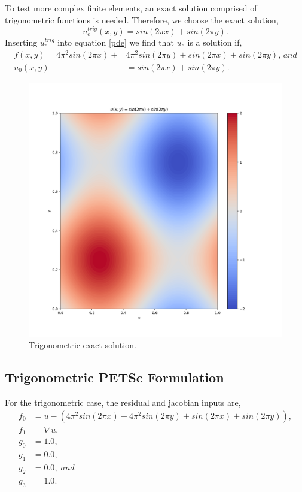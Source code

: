 To test more complex finite elements, an exact solution comprised of trigonometric functions is needed.  Therefore, we choose the exact solution,
\begin{equation}
u_e^{trig}(x,y) = sin( 2 \pi x) + sin( 2 \pi y).
\end{equation}
Inserting $u_e^{trig}$ into equation \eqref{pde} we find that $u_e$ is a solution if,
\begin{align}
f(x,y) = 4 \pi^2 sin(2 \pi x) +& 4 \pi^2 sin(2 \pi y) + sin( 2 \pi x) + sin( 2 \pi y), \, and \\
u_0(x,y) &= sin( 2 \pi x) + sin( 2 \pi y).
\end{align}
\begin{figure}[!ht]
\begin{center}
\includegraphics[scale=0.4]{figures/Trig_Exact.png}
\end{center}
\caption{Trigonometric exact solution.}
\label{TrigExact}
\end{figure}

\subsection{Trigonometric PETSc Formulation}

For the trigonometric case, the residual and jacobian inputs are,
\begin{align}
f_0 &= u - (4 \pi^2 sin(2 \pi x) + 4 \pi^2 sin(2 \pi y) + sin( 2 \pi x) + sin( 2 \pi y)), \\
f_1 &= \nabla u, \\
g_0 &= 1.0, \\
g_1 &= 0.0, \\
g_2 &= 0.0,\; and \\
g_3 &= 1.0.
\end{align}
